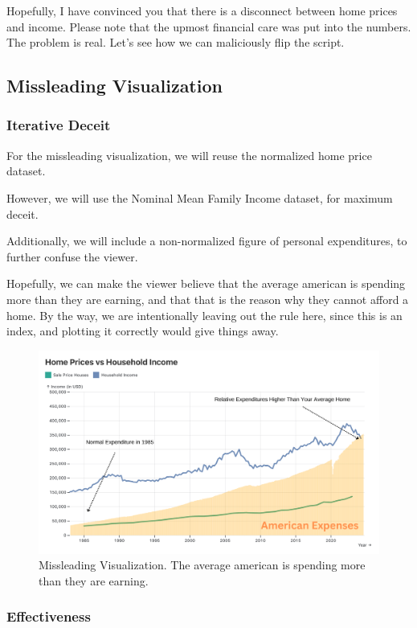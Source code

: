 \documentclass{article}
\begin{document}
Hopefully, I have convinced you that there is a disconnect between home prices and income. 
Please note that the upmost financial care was put into the numbers. The problem is real. 
Let's see how we can maliciously flip the script.

\newpage

\subsection{Missleading Visualization}
\subsubsection{Iterative Deceit}

For the missleading visualization, we will reuse the normalized home price dataset.

However, we will use the Nominal Mean Family Income dataset, for maximum deceit.

Additionally, we will include a non-normalized figure of personal expenditures, to further confuse the viewer.

Hopefully, we can make the viewer believe that the average american is spending more than they are earning,
and that that is the reason why they cannot afford a home. By the way, we are intentionally leaving out the rule here,
since this is an index, and plotting it correctly would give things away.

\begin{figure}[ht] 
  \centering
  \includegraphics[width=.75\textwidth]{figs/missleading.png}
  \caption{
      Missleading Visualization. The average american is spending more than they are earning.
  }
  \label{fig:missleading}
\end{figure}
\subsubsection{Effectiveness}
\end{document}
